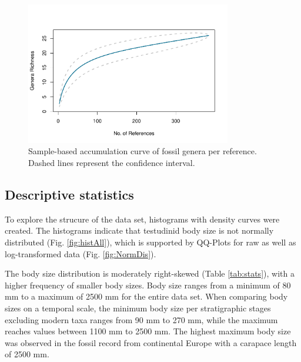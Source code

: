 \begin{figure}[htbp]
	\centering
	\includegraphics[width=0.8\textwidth]{MA_JJ_files/figure-latex/SACGenera-1.pdf}
	\caption[Sample-based accumulation curve on generic level]{Sample-based accumulation curve of fossil genera per reference. Dashed lines represent the confidence interval.}
	\label{fig:SACGen}
\end{figure}


\FloatBarrier



\subsection{Descriptive statistics}

To explore the strucure of the data set, histograms with density curves were created.
The histograms indicate that testudinid body size is not normally distributed (Fig. \ref{fig:histAll}), which is supported by QQ-Plots for raw as well as log-transformed data (Fig. \ref{fig:NormDis}).

The body size distribution is moderately right-skewed (Table \ref{tab:stats}), with a higher frequency of smaller body sizes.
Body size ranges from a minimum of 80 mm to a maximum of 2500 mm for the entire data set. When comparing body sizes on a temporal scale, the minimum body size per stratigraphic stages excluding modern taxa ranges from 90 mm to 270 mm, while the maximum reaches values between 1100 mm to 2500 mm. The highest maximum body size was observed in the fossil record from continental Europe with a carapace length of 2500 mm.

